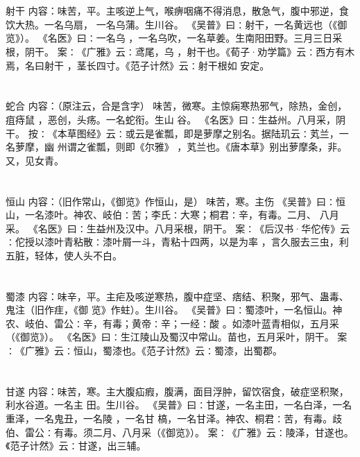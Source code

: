 \documentclass[12pt,UTF8]{ctexbook}
\begin{document}
\chapter{}射干
内容：味苦，平。主咳逆上气，喉痹咽痛不得消息，散急气，腹中邪逆，食饮大热。一名乌扇， 
一名乌蒲。生川谷。 
《吴普》曰∶射干，一名黄远也（《御览》）。 
《名医》曰∶一名乌 ，一名乌吹，一名草姜。生南阳田野。三月三日采根，阴干。 
案∶《广雅》云∶鸢尾，乌 ，射干也。《荀子·劝学篇》云∶西方有木焉，名曰射干 
，茎长四寸。《范子计然》云∶射干根如 安定。 


\chapter{}蛇合
内容：（原注云，合是含字） 
味苦，微寒。主惊痫寒热邪气，除热，金创，疽痔鼠 ，恶创，头疡。一名蛇衔。生山 
谷。 
《名医》曰∶生益州。八月采，阴干。 
按∶《本草图经》云∶或云是雀瓢，即是萝摩之别名。据陆玑云∶芄兰，一名萝摩，幽 
州谓之雀瓢，则即《尔雅》 ，芄兰也。《唐本草》别出萝摩条，非。又，见女青。 


\chapter{}恒山
内容：（旧作常山，《御览》作恒山，是） 
味苦，寒。主伤 
《吴普》曰∶恒山，一名漆叶。神农、岐伯∶苦；李氏∶大寒；桐君∶辛，有毒。二月、 
八月采。 
《名医》曰∶生益州及汉中。八月采根，阴干。 
案∶《后汉书·华佗传》云∶佗授以漆叶青粘散∶漆叶屑一斗，青粘十四两，以是为率 
，言久服去三虫，利五脏，轻体，使人头不白。 


\chapter{}蜀漆
内容：味辛，平。主疟及咳逆寒热，腹中症坚、痞结、积聚，邪气、蛊毒、鬼注（旧作疰，《御 
览》作蛀）。生川谷。 
《吴普》曰∶蜀漆叶，一名恒山。神农、岐伯、雷公∶辛，有毒；黄帝∶辛；一经∶酸 
。如漆叶蓝青相似，五月采（《御览》）。 
《名医》曰∶生江陵山及蜀汉中常山。苗也，五月采叶，阴干。 
案∶《广雅》云∶恒山，蜀漆也。《范子计然》云∶蜀漆，出蜀郡。 


\chapter{}甘遂
内容：味苦，寒。主大腹疝瘕，腹满，面目浮肿，留饮宿食，破症坚积聚，利水谷道。一名主 
田。生川谷。 
《吴普》曰∶甘遂，一名主田，一名白泽，一名重泽，一名鬼丑，一名陵 ，一名甘 
槁，一名甘泽。神农、桐君∶苦，有毒。歧伯、雷公∶有毒。须二月、八月采（《御览》）。 
案∶《广雅》云∶陵泽，甘遂也。《范子计然》云∶甘遂，出三辅。 
\end{document}

